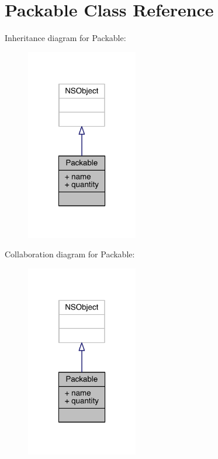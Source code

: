\hypertarget{interface_packable}{\section{Packable Class Reference}
\label{interface_packable}
}


Inheritance diagram for Packable\-:\nopagebreak
\begin{figure}[H]
\begin{center}
\leavevmode
\includegraphics[width=138pt]{interface_packable__inherit__graph}
\end{center}
\end{figure}


Collaboration diagram for Packable\-:\nopagebreak
\begin{figure}[H]
\begin{center}
\leavevmode
\includegraphics[width=138pt]{interface_packable__coll__graph}
\end{center}
\end{figure}
